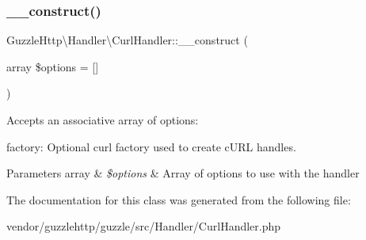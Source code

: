 \subsubsection{\texorpdfstring{\+\_\+\+\_\+construct()}{\_\_construct()}}
{\footnotesize\ttfamily Guzzle\+Http\textbackslash{}\+Handler\textbackslash{}\+Curl\+Handler\+::\+\_\+\+\_\+construct (\begin{DoxyParamCaption}\item[{array}]{\$options = {\ttfamily \mbox{[}\mbox{]}} }\end{DoxyParamCaption})}

Accepts an associative array of options\+:


\begin{DoxyItemize}
\item factory\+: Optional curl factory used to create c\+U\+RL handles.
\end{DoxyItemize}


\begin{DoxyParams}[1]{Parameters}
array & {\em \$options} & Array of options to use with the handler \\
\hline
\end{DoxyParams}


The documentation for this class was generated from the following file\+:\begin{DoxyCompactItemize}
\item 
vendor/guzzlehttp/guzzle/src/\+Handler/Curl\+Handler.\+php\end{DoxyCompactItemize}

